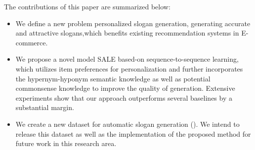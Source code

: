 The contributions of this paper are summarized below:
\begin{itemize}
	\item We define a new problem personalized slogan generation, 
	generating accurate and attractive slogans,which benefits existing
	recommendation systems in E-commerce.
	\item We propose a novel model SALE based-on sequence-to-sequence learning, 
	which utilizes item preferences for personalization and further incorporates the hypernym-hyponym semantic knowledge as well as potential commonsense knowledge to improve the quality of generation. Extensive experiments show that our approach outperforms several baselines by a substantial margin.
	\item We create a new dataset for automatic slogan generation ().
	We intend to release this dataset as well as the implementation of the proposed method for future work in this research area. 
\end{itemize}





%





%


